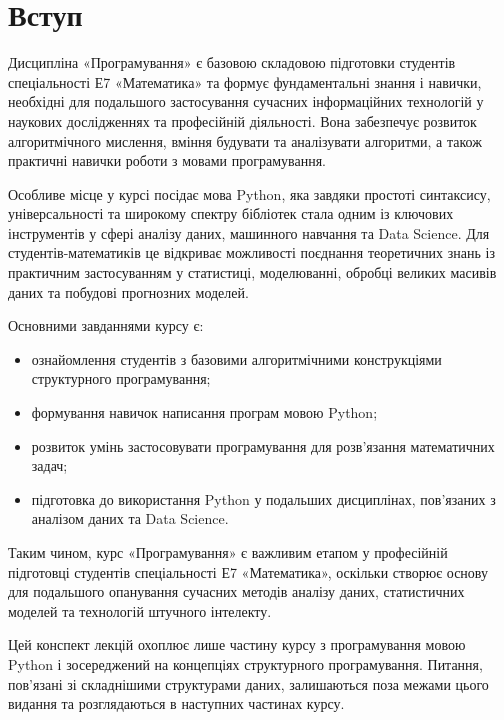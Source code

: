 \section*{Вступ}

Дисципліна «Програмування» є базовою складовою підготовки студентів спеціальності 
Е7 «Математика» та формує фундаментальні знання і навички, необхідні для подальшого 
застосування сучасних інформаційних технологій у наукових дослідженнях та професійній діяльності. 
Вона забезпечує розвиток алгоритмічного мислення, вміння будувати та аналізувати алгоритми, 
а також практичні навички роботи з мовами програмування.

Особливе місце у курсі посідає мова Python, яка завдяки простоті синтаксису, універсальності 
та широкому спектру бібліотек стала одним із ключових інструментів у сфері аналізу даних, 
машинного навчання та Data Science. Для студентів-математиків це відкриває можливості 
поєднання теоретичних знань із практичним застосуванням у статистиці, моделюванні, 
обробці великих масивів даних та побудові прогнозних моделей.

Основними завданнями курсу є:
\begin{itemize}
	\item ознайомлення студентів з базовими алгоритмічними конструкціями структурного програмування;
	\item формування навичок написання програм мовою Python;
	\item розвиток умінь застосовувати програмування для розв’язання математичних задач;
	\item підготовка до використання Python у подальших дисциплінах, пов’язаних з аналізом даних та Data Science.
\end{itemize}

Таким чином, курс «Програмування» є важливим етапом у професійній підготовці студентів 
спеціальності Е7 «Математика», оскільки створює основу для подальшого опанування сучасних 
методів аналізу даних, статистичних моделей та технологій штучного інтелекту.

Цей конспект лекцій охоплює лише частину курсу з програмування мовою Python і зосереджений на концепціях структурного програмування. Питання, пов’язані зі складнішими структурами даних, залишаються поза межами цього видання та розглядаються в наступних частинах курсу.